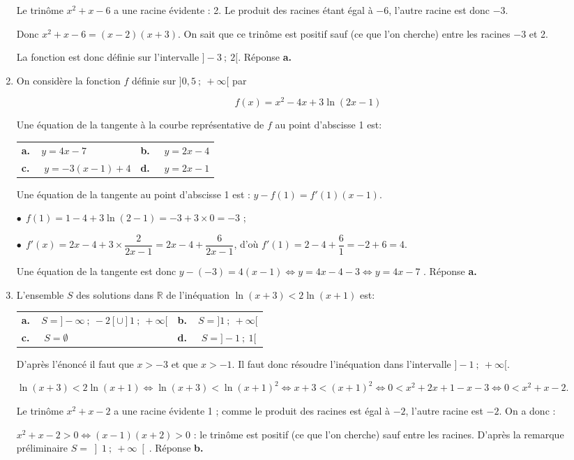 \documentclass[10pt]{article}
\providecommand{\R}{\mathbb{R}}
\begin{document}
\begin{enumerate}
Le trinôme $x^2 +x - 6$ a une racine évidente : 2. Le produit des racines étant égal à $- 6$, l'autre racine est donc $- 3$.

Donc $x^2 + x - 6 = (x - 2)(x + 3)$. On sait que ce trinôme est positif sauf (ce que l'on cherche) entre les racines $- 3$ et 2.

La fonction est donc définie sur l'intervalle $]-3~;~2[$. Réponse \textbf{a.}

\item On considère la fonction $f$ définie sur $]0,5~;~+ \infty [$ par 

\[f(x) =x^2- 4x+ 3 \ln (2x - 1)\]

Une équation de la tangente à la courbe représentative de $f$ au point d'abscisse 1 est:

\begin{center}
\begin{tabularx}{\linewidth}{*{2}{X}}
\textbf{a.~~}$y = 4x- 7$ &\textbf{b.~~} $y = 2x - 4$\\
\textbf{c.~~} $y = -3(x - 1) + 4$ &\textbf{d.~~} $y = 2x - 1$
\end{tabularx}
\end{center}
Une équation de la tangente au point d'abscisse 1 est : $y - f(1) = f'(1)(x - 1)$.

$\bullet~~$$f(1) = 1 - 4 + 3\ln (2 - 1) = - 3 + 3 \times 0 = - 3$ ;

$\bullet~~$$f'(x) = 2x - 4 + 3 \times \dfrac{2}{2x - 1} = 2x - 4 + \dfrac{6}{2x - 1}$, d'où $f'(1) = 2 - 4 + \dfrac{6}{1} = - 2 + 6 = 4$.

Une équation de la tangente est donc $y - (- 3) = 4(x - 1) \iff y = 4x - 4 - 3\iff y = 4x - 7$ . Réponse \textbf{a.}

\item L'ensemble $S$ des solutions dans $\R$ de l'inéquation $\ln (x + 3) < 2\ln (x + 1)$ est:

\begin{center}
\begin{tabularx}{\linewidth}{*{2}{X}}
\textbf{a.~~}$S = ]- \infty~;~-2[ \cup ]1~;~+\infty[$&\textbf{b.~~}$S = ]1~;~+ \infty[$\\
\textbf{c.~~} $S = \emptyset$&\textbf{d.~~} $S = ]- 1~;~1[$
\end{tabularx}
\end{center}
D'après l'énoncé il faut que $x > -3$ et que $x > - 1$. Il faut donc résoudre l'inéquation dans l'intervalle $]- 1~;~+ \infty[$.

$\ln (x + 3) < 2\ln (x + 1) \iff \ln (x + 3) < \ln (x + 1)^2 \iff x + 3 <  (x + 1)^2  \iff  0 < x^2 + 2x + 1 - x - 3 \iff 0< x^2 + x - 2$.

Le trinôme $x^2 + x - 2$ a une racine évidente 1 ; comme le produit des racines est égal à $- 2$, l'autre racine est $- 2$. On a donc :

$x^2 + x - 2  > 0 \iff (x - 1)(x + 2)> 0$ : le trinôme est positif (ce que l'on cherche) sauf entre les racines. D'après la remarque préliminaire  $S = \left]1~;~+ \infty\right[$. Réponse \textbf{b.}
\end{enumerate}

\bigskip
\end{document}
